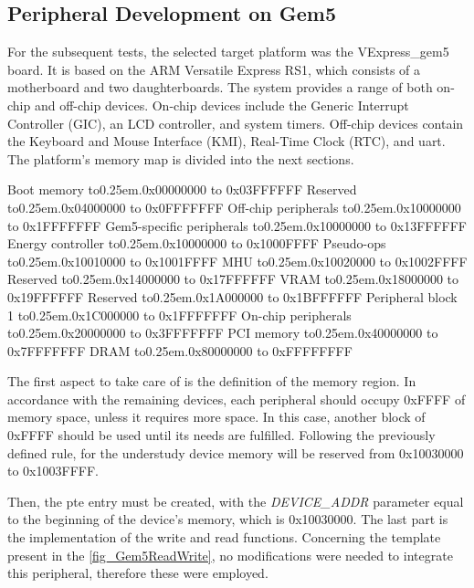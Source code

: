 \subsection{Peripheral Development on Gem5}

For the subsequent tests, the selected target platform was the VExpress\_gem5 board. It is based on the ARM Versatile Express RS1, which 
consists of a motherboard and two daughterboards. The system provides a range of both on-chip and off-chip devices.
On-chip devices include the Generic Interrupt Controller (GIC), an LCD controller, and system timers.
Off-chip devices contain the Keyboard and Mouse Interface (KMI), Real-Time Clock (RTC), and \gls{uart}. 
The platform's memory map is divided into the next sections.

\def\mydots{\xleaders\hbox to0.25em{\hfill.\hfill}\hfill}

\begin{outline}[enumerate]
	\1 Boot memory 						\mydots 	0x00000000 to 0x03FFFFFF
	\1 Reserved							\mydots 	0x04000000 to 0x0FFFFFFF
	\1 Off-chip peripherals				\mydots 	0x10000000 to 0x1FFFFFFF
		\2 Gem5-specific peripherals	\mydots 	0x10000000 to 0x13FFFFFF
			\3 Energy controller 		\mydots 	0x10000000 to 0x1000FFFF
			\3 Pseudo-ops				\mydots		0x10010000 to 0x1001FFFF
			\3 MHU						\mydots		0x10020000 to 0x1002FFFF
		\2 Reserved 					\mydots 	0x14000000 to 0x17FFFFFF
		\2 VRAM							\mydots		0x18000000 to 0x19FFFFFF
		\2 Reserved 					\mydots		0x1A000000 to 0x1BFFFFFF
		\2 Peripheral block 1			\mydots		0x1C000000 to 0x1FFFFFFF
	\1 On-chip  peripherals				\mydots 	0x20000000 to 0x3FFFFFFF
	\1 PCI memory 						\mydots 	0x40000000 to 0x7FFFFFFF
	\1 DRAM								\mydots 	0x80000000 to 0xFFFFFFFF
\end{outline}

The first aspect to take care of is the definition of the memory region. In accordance with the remaining devices, each peripheral should 
occupy 0xFFFF of memory space, unless it requires more space. In this case, another block of 0xFFFF should be used until its needs are fulfilled. 
Following the previously defined rule, for the understudy device memory will be reserved from 0x10030000 to 0x1003FFFF.

Then, the \gls{pte} entry must be created, with the \textit{DEVICE\_ADDR} \space parameter equal to the beginning of the device's memory, which 
is 0x10030000. The last part is the implementation of the write and read functions. Concerning the 
template present in the \autoref{fig_Gem5ReadWrite}, no modifications were needed to integrate this peripheral, therefore these were employed. 

